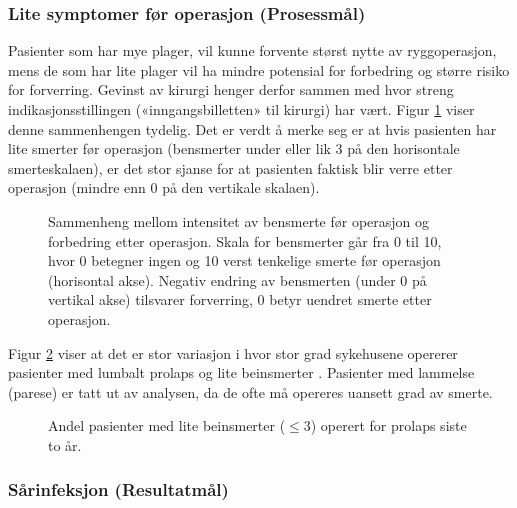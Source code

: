 \clearpage
 \subsubsection{Lite symptomer før operasjon (Prosessmål)}     
      Pasienter som har mye plager, vil kunne forvente størst nytte av ryggoperasjon,
mens de som har lite plager vil ha mindre potensial for forbedring og større risiko
for forverring. Gevinst av kirurgi henger derfor sammen med hvor streng
indikasjonsstillingen («inngangsbilletten» til kirurgi) har vært. Figur \ref{fig:BeinsmEndrPre} viser denne
sammenhengen tydelig. Det er verdt å merke seg er at hvis pasienten har lite smerter før
operasjon (bensmerter under eller lik 3 på den horisontale smerteskalaen), er det stor
sjanse for at pasienten faktisk blir verre  etter
operasjon (mindre enn 0 på den vertikale skalaen). \\

\begin{figure}[ht]
\caption{\label{fig:BeinsmEndrPre}  Sammenheng mellom intensitet av bensmerte før operasjon og
      forbedring etter operasjon. Skala for bensmerter går fra 0 til 10, hvor 0 betegner
      ingen og 10 verst tenkelige smerte før operasjon (horisontal akse). Negativ endring
      av bensmerten (under 0 på vertikal akse) tilsvarer forverring, 0 betyr uendret smerte etter
      operasjon.}
\end{figure}

\clearpage

Figur \ref{fig:BeinsmLavPre} viser at det er stor variasjon i hvor stor grad sykehusene opererer
pasienter med lumbalt prolaps og lite beinsmerter . Pasienter med lammelse (parese) er tatt
ut av analysen, da de ofte må opereres uansett grad av smerte.




\begin{figure}[ht]
\caption{\label{fig:BeinsmLavPre}  Andel pasienter med lite beinsmerter ($\leq 3$) operert for prolaps siste to år.}
\end{figure}






\subsubsection{Sårinfeksjon (Resultatmål)}




